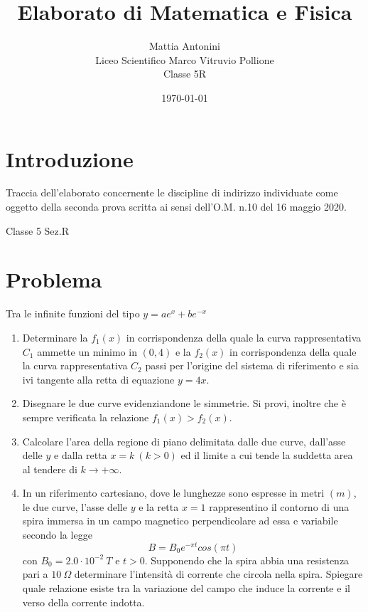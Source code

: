 \documentclass[a4paper,12pt]{article}
\begin{document}
\title{Elaborato di Matematica e Fisica}
\author{Mattia Antonini \\ Liceo Scientifico Marco Vitruvio Pollione\\Classe 5R}
\date{\today}
\maketitle

\tableofcontents
\newpage
{}

\section{Introduzione}
Traccia dell’elaborato concernente le discipline di indirizzo individuate come
oggetto della seconda prova scritta ai sensi dell’O.M. n.10 del 16 maggio 2020.

\begin{center}
Classe 5 Sez.R
\end{center}
\section{Problema}
Tra le infinite funzioni del tipo $y = ae^x + be^{-x}$

\begin{enumerate}
\item Determinare la $f_1(x)$  in corrispondenza della quale la curva rappresentativa $C_1$ ammette un minimo in $(0,4)$ e la $f_2(x)$ in corrispondenza della quale la curva rappresentativa $C_2$ passi per l’origine del sistema di riferimento e sia ivi tangente alla retta di equazione $y = 4x$.

\item Disegnare le due curve evidenziandone le simmetrie. Si provi, inoltre che è sempre verificata la relazione $f_1(x) > f_2(x)$. 

\item  Calcolare l’area della regione di piano delimitata dalle due curve, dall’asse delle $y$ e dalla retta $x = k\ (k>0)$ ed il limite a cui tende la suddetta area al tendere di $k \rightarrow +\infty$.
\item In un riferimento cartesiano, dove le lunghezze sono espresse in metri $(m)$, le due curve, l’asse delle $y$ e la retta $x =1$ rappresentino il contorno di una spira immersa in un campo magnetico perpendicolare ad essa e variabile secondo la legge $$B = B_0e^{-\pi t}cos(\pi t)$$ 
con $B_0 = 2.0\cdot10^{-2}\ T$ e $ t >0$.
Supponendo che la spira abbia una resistenza pari a $10\ \Omega$ determinare l’intensità di corrente che circola nella spira. Spiegare quale relazione esiste tra la variazione del campo che induce la corrente e il verso della corrente indotta.

\end{enumerate}
\newpage
\end{document}

